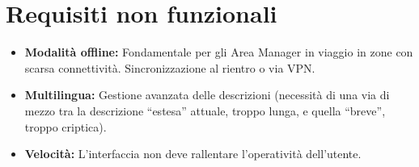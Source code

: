 \section{Requisiti non funzionali}
\begin{itemize}
      \item \textbf{Modalità offline:} Fondamentale per gli Area Manager in viaggio in zone
            con scarsa connettività.
            Sincronizzazione al rientro o via \ac{VPN}.
      \item \textbf{Multilingua:} Gestione avanzata delle descrizioni (necessità di una via di mezzo tra la descrizione
            ``estesa'' attuale, troppo lunga, e quella ``breve'', troppo criptica).
      \item \textbf{Velocità:} L'interfaccia non deve rallentare l'operatività dell'utente.
\end{itemize}